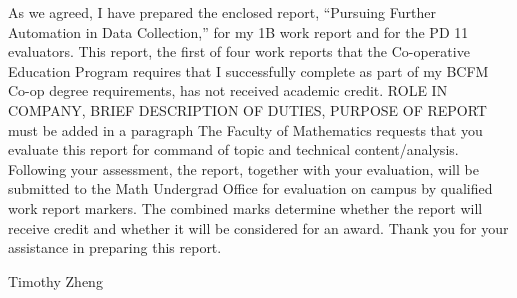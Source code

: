 \documentclass[12pt]{article}
\newcommand{\term}{1B } %
\newcommand{\WTT}{Pursuing Further Automation in Data Collection}
\begin{document}




\FirstPage

\newpage




\LetterHead



As we agreed, I have prepared the enclosed report, “\WTT,” for
my \term work report and for the PD 11 evaluators. This
report, the first of four work reports that the Co-operative Education Program
requires that I successfully complete as part of my BCFM Co-op degree
requirements, has not received academic credit.
\vskip 10pt
ROLE IN COMPANY, BRIEF DESCRIPTION OF DUTIES, PURPOSE OF REPORT must be added in a paragraph
\vskip 10pt 
The Faculty of Mathematics requests that you evaluate this report for command
of topic and technical content/analysis. Following your assessment, the report,
together with your evaluation, will be submitted to the Math Undergrad Office
for evaluation on campus by qualified work report markers. The combined
marks determine whether the report will receive credit and whether it will be
considered for an award.
\vskip 10pt 
Thank you for your assistance in preparing this report.

Timothy Zheng






\toc 






\end{document}
